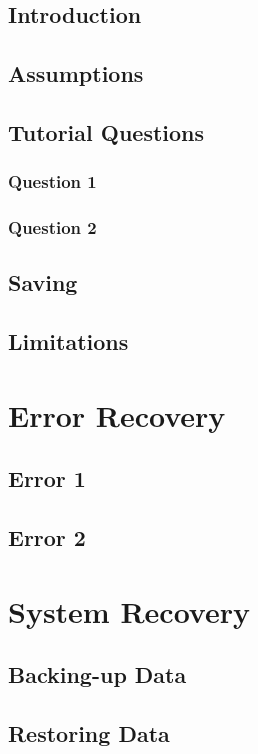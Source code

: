 \subsection{Introduction}

\subsection{Assumptions}

\subsection{Tutorial Questions}

\subsubsection{Question 1}

\subsubsection{Question 2}

\subsection{Saving}

\subsection{Limitations}

\section{Error Recovery}

\subsection{Error 1}

\subsection{Error 2}

\section{System Recovery}

\subsection{Backing-up Data}

\subsection{Restoring Data}